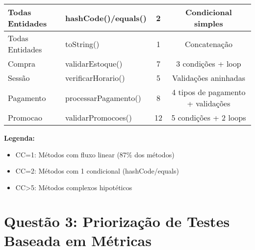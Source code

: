 \documentclass{article}
\begin{document}
\begin{table}[H]
{\begin{tabular}{|l|l|c|c|}
Todas Entidades & hashCode()/equals() & 2 & Condicional simples \\ \hline
Todas Entidades & toString() & 1 & Concatenação \\ \hline
Compra & validarEstoque() & 7 & 3 condições + loop \\ \hline
Sessão & verificarHorario() & 5 & Validações aninhadas \\ \hline
Pagamento & processarPagamento() & 8 & 4 tipos de pagamento + validações \\ \hline
Promocao & validarPromocoes() & 12 & 5 condições + 2 loops \\ \hline
\end{tabular}%
}
\end{table}

\textbf{Legenda:}
\begin{itemize}
\item CC=1: Métodos com fluxo linear (87\% dos métodos)
\item CC=2: Métodos com 1 condicional (hashCode/equals)
\item CC\textgreater 5: Métodos complexos hipotéticos
\end{itemize}

\section*{Questão 3: Priorização de Testes Baseada em Métricas}

\begin{table}[H] %
\centering
\caption{Elementos Prioritários para Testes}
\end{table}
\end{document}
